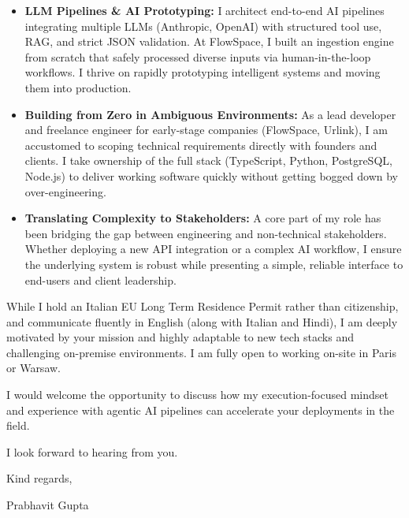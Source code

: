 \documentclass[11pt,a4paper]{article}
\begin{document}
\begin{itemize}[leftmargin=*]
    \item \textbf{LLM Pipelines \& AI Prototyping:} I architect end-to-end AI pipelines integrating multiple LLMs (Anthropic, OpenAI) with structured tool use, RAG, and strict JSON validation. At FlowSpace, I built an ingestion engine from scratch that safely processed diverse inputs via human-in-the-loop workflows. I thrive on rapidly prototyping intelligent systems and moving them into production.
    \item \textbf{Building from Zero in Ambiguous Environments:} As a lead developer and freelance engineer for early-stage companies (FlowSpace, Urlink), I am accustomed to scoping technical requirements directly with founders and clients. I take ownership of the full stack (TypeScript, Python, PostgreSQL, Node.js) to deliver working software quickly without getting bogged down by over-engineering.
    \item \textbf{Translating Complexity to Stakeholders:} A core part of my role has been bridging the gap between engineering and non-technical stakeholders. Whether deploying a new API integration or a complex AI workflow, I ensure the underlying system is robust while presenting a simple, reliable interface to end-users and client leadership.
\end{itemize}

\noindent While I hold an Italian EU Long Term Residence Permit rather than citizenship, and communicate fluently in English (along with Italian and Hindi), I am deeply motivated by your mission and highly adaptable to new tech stacks and challenging on-premise environments. I am fully open to working on-site in Paris or Warsaw.

\noindent I would welcome the opportunity to discuss how my execution-focused mindset and experience with agentic AI pipelines can accelerate your deployments in the field.

\noindent I look forward to hearing from you.

\vspace{10pt}

\noindent Kind regards,

\vspace{10pt}

\noindent Prabhavit Gupta
\end{document}
